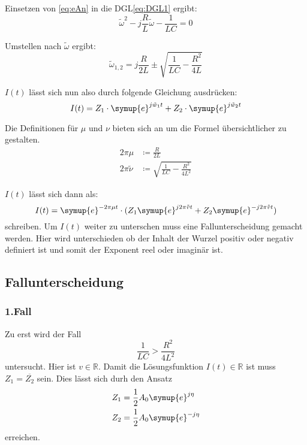     \noindent Einsetzen von \ref{eq:eAn} in die DGL\ref{eq:DGL1} ergibt:
    \begin{equation}
        \tilde{\omega}^2 - j \frac{R}{L}\tilde{\omega} - \frac{1}{LC} = 0 \nonumber
    \end{equation}

    \noindent Umstellen nach $\tilde{\omega}$ ergibt:
    \begin{equation}
        \tilde{\omega}_{1,2} = j \frac{R}{2L} \pm \sqrt{\frac{1}{LC}-\frac{R^2}{4L}} \nonumber
    \end{equation}
    
    \noindent $I(t)$ lässt sich nun also durch folgende Gleichung ausdrücken:
    \begin{equation}
        I(t) = Z_1 \cdot \symup{e}^{j \tilde{w}_1t} + Z_2 \cdot \symup{e}^{j\tilde{w}_2 t} \nonumber
    \end{equation}
    
    \noindent Die Definitionen für $\mu$ und $\nu$ bieten sich an um die Formel übersichtlicher zu gestalten.
    \begin{align}
        2 \pi \mu & \coloneq \frac{R}{2L} \nonumber\\ 
        2 \pi \tilde{\nu} & \coloneq \sqrt{\frac{1}{LC} - \frac{R^2}{4L^2}} \nonumber
    \end{align}

    \noindent $I(t)$ lässt sich dann als:
    \begin{equation}
        I(t) = \symup{e}^{- 2 \pi \mu t} \cdot  (Z_1 \symup{e}^{j 2\pi \tilde{v}t} + Z_2 \symup{e}^{-j 2\pi \tilde{v} t}) \nonumber
    \end{equation}
    \noindent schreiben. Um $I(t)$ weiter zu unterschen muss eine Fallunterscheidung gemacht werden. Hier wird unterschieden ob der 
    Inhalt der Wurzel positiv oder negativ definiert ist und somit der Exponent reel oder imaginär ist. 
    \subsection{Fallunterscheidung}

        \subsubsection{1.Fall}
        Zu erst wird der Fall
        \begin{equation}
            \frac{1}{LC} > \frac{R^2}{4L^2}  \nonumber
        \end{equation}
        untersucht. Hier ist $v \in \mathds{R}$. Damit die Lösungsfunktion $I(t) \in \mathds{R}$ ist muss
        $Z_1 = \overline{Z_2}$ sein. Dies lässt sich durh den Ansatz
        \begin{align}
            Z_1 & = \frac{1}{2} A_0 \symup{e}^{j \eta } \nonumber\\
            Z_2 & = \frac{1}{2} A_0 \symup{e}^{-j \eta} \nonumber
        \end{align}
        erreichen.
        

